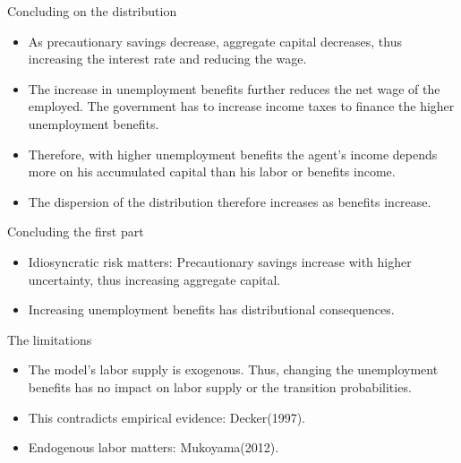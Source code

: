 \documentclass{beamer}
\begin{document}
\begin{frame}{Concluding on the distribution}

\begin{itemize} 


	\item {
As precautionary savings decrease, aggregate capital decreases, thus increasing the interest rate and reducing the wage. 
}
	\item {
The increase in unemployment benefits further reduces the net wage of the employed. The government has to increase income taxes to finance the higher unemployment benefits.
}
	\item {
Therefore, with higher unemployment benefits the agent's income depends more on his accumulated capital than his labor or benefits income. 
}
	\item {
The dispersion of the distribution therefore increases as benefits increase.
}


\end{itemize}

\end{frame}


\begin{frame}{Concluding the first part}
	
	\begin{itemize}
	
	\item {
Idiosyncratic risk matters: 
Precautionary savings increase with higher uncertainty, thus increasing aggregate capital. 
	}	
	\item {
Increasing unemployment benefits has distributional consequences. 
	}	

	\end{itemize} 
\end{frame}

\begin{frame}{The limitations}
	
	\begin{itemize}
	
	\item {The model's labor supply is exogenous. Thus, changing the unemployment benefits has no impact on labor supply or the transition probabilities.
}	
	\item {This contradicts empirical evidence: Decker(1997).
	}
	\item{Endogenous labor matters: Mukoyama(2012).
	}

	\end{itemize} 
\end{frame}
\end{document}
